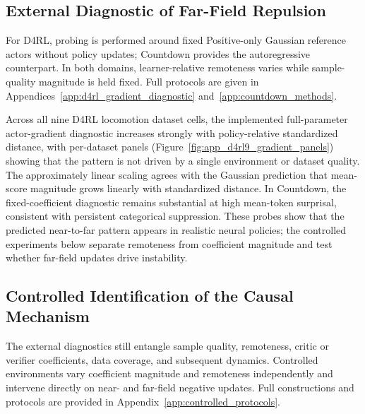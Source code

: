 \documentclass{article}
\theoremstyle{plain}
\theoremstyle{definition}
\theoremstyle{remark}
\begin{document}
\subsection{External Diagnostic of Far-Field Repulsion}
\label{sec:external_far_field}

For D4RL, probing is performed around fixed Positive-only Gaussian reference
actors without policy updates; Countdown provides the autoregressive
counterpart. In both domains, learner-relative remoteness varies while
sample-quality magnitude is held fixed. Full protocols are given in
Appendices~\ref{app:d4rl_gradient_diagnostic}
and~\ref{app:countdown_methods}.

Across all nine D4RL locomotion dataset cells, the implemented
full-parameter actor-gradient diagnostic increases strongly with
policy-relative standardized distance, with per-dataset panels
(Figure~\ref{fig:app_d4rl9_gradient_panels}) showing that the pattern is not
driven by a single environment or dataset quality. The approximately linear
scaling agrees with the Gaussian prediction that mean-score magnitude grows
linearly with standardized distance. In Countdown, the fixed-coefficient
diagnostic remains substantial at high mean-token surprisal, consistent with
persistent categorical suppression. These probes show that the predicted
near-to-far pattern appears in realistic neural policies; the controlled
experiments below separate remoteness from coefficient magnitude and test
whether far-field updates drive instability.




\subsection{Controlled Identification of the Causal Mechanism}
\label{sec:controlled_identification}

The external diagnostics still entangle sample quality, remoteness, critic or
verifier coefficients, data coverage, and subsequent dynamics. Controlled
environments vary coefficient magnitude and remoteness independently and
intervene directly on near- and far-field negative updates. Full constructions
and protocols are provided in
Appendix~\ref{app:controlled_protocols}.
\end{document}
